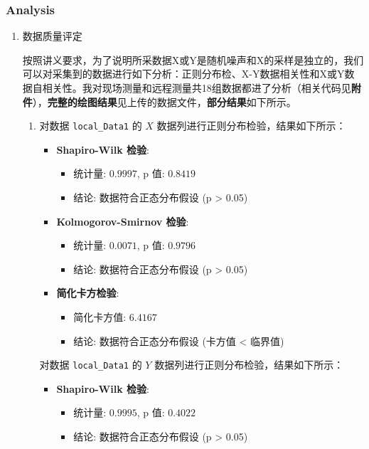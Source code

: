 \subsubsection{Analysis}
\begin{enumerate}
	\item 数据质量评定
	
	按照讲义要求，为了说明所采数据X或Y是随机噪声和X的采样是独立的，我们可以对采集到的数据进行如下分析：正则分布检、X-Y数据相关性和X或Y数据自相关性。我对现场测量和远程测量共18组数据都进了分析（相关代码见\textbf{附件}），\textbf{完整的绘图结果}见上传的数据文件，\textbf{部分结果}如下所示。
	
	\begin{enumerate}
		\item 对数据 \texttt{local\_Data1} 的 \(X\) 数据列进行正则分布检验，结果如下所示：
		
		\begin{itemize}
			\item \textbf{Shapiro-Wilk 检验}:
			\begin{itemize}
				\item 统计量: \(0.9997\), p 值: \(0.8419\)
				\item 结论: 数据符合正态分布假设 (p > 0.05)
			\end{itemize}
			
			\item \textbf{Kolmogorov-Smirnov 检验}:
			\begin{itemize}
				\item 统计量: \(0.0071\), p 值: \(0.9796\)
				\item 结论: 数据符合正态分布假设 (p > 0.05)
			\end{itemize}
			
			\item \textbf{简化卡方检验}:
			\begin{itemize}
				\item 简化卡方值: \(6.4167\)
				\item 结论: 数据符合正态分布假设 (卡方值 < 临界值)
			\end{itemize}
		\end{itemize}
		
		对数据 \texttt{local\_Data1} 的 \(Y\) 数据列进行正则分布检验，结果如下所示：
		
		\begin{itemize}
			\item \textbf{Shapiro-Wilk 检验}:
			\begin{itemize}
				\item 统计量: \(0.9995\), p 值: \(0.4022\)
				\item 结论: 数据符合正态分布假设 (p > 0.05)
			\end{itemize}
			

\end{itemize}
\end{enumerate}
\end{enumerate}
